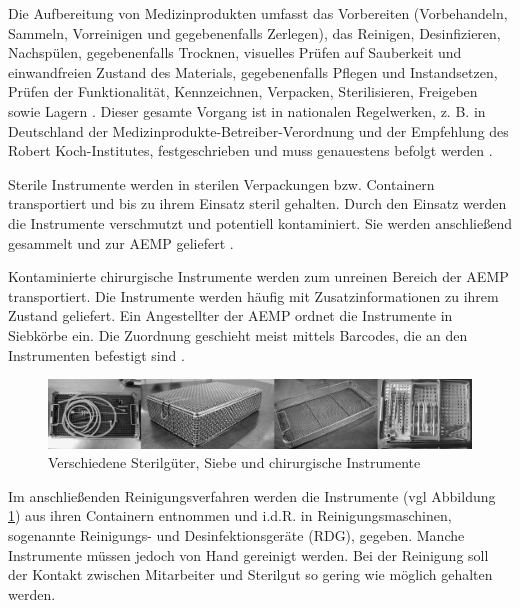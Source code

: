Die Aufbereitung von Medizinprodukten umfasst das Vorbereiten (Vorbehandeln, Sammeln, Vorreinigen und gegebenenfalls Zerlegen), das Reinigen, Desinfizieren, Nachspülen, gegebenenfalls Trocknen, visuelles Prüfen auf Sauberkeit und einwandfreien Zustand des Materials, gegebenenfalls Pflegen und Instandsetzen, Prüfen der Funktionalität, Kennzeichnen, Verpacken, Sterilisieren, Freigeben sowie Lagern \cite{AKI-ArbeitskreisInstrumenten-Aufbereitung2012}. Dieser gesamte Vorgang ist in nationalen Regelwerken, z. B. in Deutschland der Medizinprodukte-Betreiber-Verordnung und der Empfehlung des Robert Koch-Institutes, festgeschrieben und muss genauestens befolgt werden \cite{AKI-ArbeitskreisInstrumenten-Aufbereitung2012}.

Sterile Instrumente werden in sterilen Verpackungen bzw. Containern transportiert und bis zu ihrem Einsatz steril gehalten. Durch den Einsatz werden die Instrumente verschmutzt und potentiell kontaminiert. Sie werden anschließend gesammelt und zur AEMP geliefert \cite[S.~7]{Ruther2014}.


Kontaminierte chirurgische Instrumente werden zum unreinen Bereich der AEMP transportiert. Die Instrumente werden häufig mit Zusatzinformationen zu ihrem Zustand geliefert. Ein Angestellter der AEMP ordnet die Instrumente in Siebkörbe ein. Die Zuordnung geschieht meist mittels Barcodes, die an den Instrumenten befestigt sind \cite[S.~9]{Ruther2014}.

\begin{figure}[htbp]
    \centering
    \includegraphics[width=1\textwidth]{data/bilder/Sterilgut_Siebe_Quelle_DGSV.pdf}
    \caption{Verschiedene Sterilgüter, Siebe und chirurgische Instrumente \cite{DGSV-DeutscheGesellschaftfurSterilgutversorgung2004}}
    \label{fig:Siebe_In_AEMP}
\end{figure}

Im anschließenden Reinigungsverfahren werden die Instrumente (vgl Abbildung \ref{fig:Siebe_In_AEMP}) aus ihren Containern entnommen und i.d.R. in Reinigungsmaschinen, sogenannte Reinigungs- und Desinfektionsgeräte (RDG), gegeben. Manche Instrumente müssen jedoch von Hand gereinigt werden. Bei der Reinigung soll der Kontakt zwischen Mitarbeiter und Sterilgut so gering wie möglich gehalten werden. 

